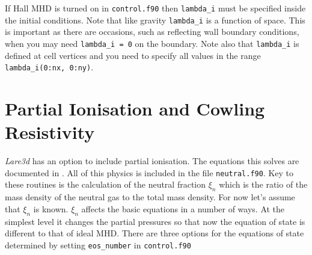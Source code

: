\documentclass[11pt]{article}
\begin{document}
If Hall MHD is turned on in \texttt{control.f90} then {\tt lambda\_i} must be specified inside the initial 
conditions. Note that like gravity {\tt lambda\_i} is a function of space. This is important as there are 
occasions, such as reflecting wall boundary conditions, when you may need {\tt lambda\_i = 0} on the boundary. 
Note also that {\tt lambda\_i} is defined at cell vertices and you need to specify all values in the range {\tt lambda\_i(0:nx, 0:ny)}.

\section{Partial Ionisation and Cowling Resistivity}
{\it Lare3d} has an option to include partial ionisation. The equations this solves are documented in 
\cite{flux-emergence}. All of this physics is included in the file \texttt{neutral.f90}. Key to these routines 
is the calculation of the neutral fraction $\xi_n$ which is the ratio of the mass density of the neutral gas to 
the total mass density. For now let's assume that $\xi_n$ is known. $\xi_n$ affects the basic equations in a 
number of ways. At the simplest level it changes the partial pressures so that now the equation of state is 
different to that of ideal MHD. There are three options for the equations of state determined by setting 
\texttt{eos\_number} in \texttt{control.f90}
\end{document}
